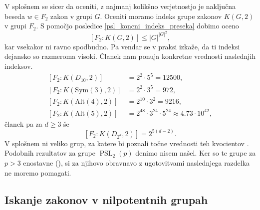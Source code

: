 V splošnem se sicer da oceniti, z najmanj kolikšno verjetnostjo je naključna beseda $w \in F_2$ zakon v grupi $G$.
Oceniti moramo indeks grupe zakonov $K(G, 2)$ v grupi $F_2$. S pomočjo posledice \ref{psl_koncni_indeks_preseka} dobimo oceno
\begin{equation*}
    \left[ F_2 : K(G, 2) \right] \le {\lvert G \rvert}^{{\lvert G \rvert}^2},
    \end{equation*}  
kar vsekakor ni ravno spodbudno. Pa vendar se v praksi izkaže, da ti indeksi dejansko so razmeroma visoki. Članek \cite{Cocke_2020} nam ponuja konkretne vrednosti naslednjih indeksov.
\begin{align*}
    \left[ F_2 : K(D_{10}, 2) \right] &= 2^2 \cdot 5^{5} = 12500, \\
    \left[ F_2 : K(\text{Sym}(3), 2) \right] &= 2^2 \cdot 3^{5} = 972, \\
    \left[ F_2 : K(\text{Alt}(4), 2) \right] &= 2^{10} \cdot  3^{2} = 9216, \\
    \left[ F_2 : K(\text{Alt}(5), 2) \right] &= 2^{48} \cdot  3^{24} \cdot 5^{24} \approx 4.73 \cdot 10^{42},   %
\end{align*}
članek \cite{Kovacs_1989} pa za $d \ge 3$ še \begin{equation*}
    \left[ F_2 : K(D_{2^d}, 2) \right] = 2^{5(d-2)}.
\end{equation*}
V splošnem ni veliko grup, za katere bi poznali točne vrednosti teh kvocientov \cite[str.~1]{Cocke_2020}. Podobnih rezultatov za grupe $\operatorname{PSL}_2(p)$ denimo nisem našel. Ker so te grupe za $p > 3$ enostavne (\cite{Jezernik_2023}), si za njihovo obravnavo
z ugotovitvami naslednjega razdelka ne moremo pomagati.

\subsection{Iskanje zakonov v nilpotentnih grupah}\label{sec_iskanje_zakonov_v_nilpotentnih_rac}

